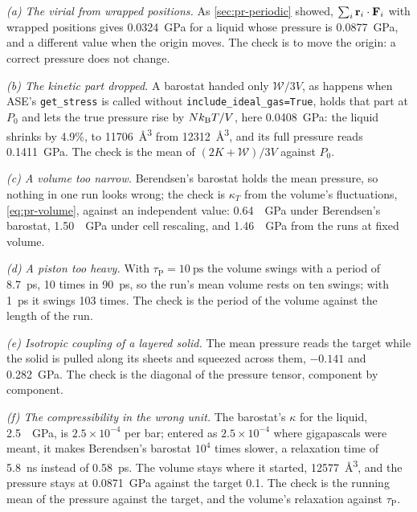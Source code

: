 \emph{(a) The virial from wrapped positions.} As \cref{sec:pr-periodic}
showed, $\sum_i\bm{\mathrm{r}}_i\cdot\bm{\mathrm{F}}_i$ with wrapped positions gives
\SI{0.0324}{\giga\pascal} for a liquid whose pressure is
\SI{0.0877}{\giga\pascal}, and a different value when the origin moves.
The check is to move the origin: a correct pressure does not change.

\emph{(b) The kinetic part dropped.} A barostat handed only $\mathcal{W}/3V$,
as happens when ASE's \texttt{get\_stress} is called without
\texttt{include\_ideal\_gas=True}, holds that part at $P_0$ and lets the
true pressure rise by $Nk_{\mathrm{B}} T/V$, here \SI{0.0408}{\giga\pascal}: the
liquid shrinks by 4.9\%, to \SI{11706}{\angstrom\cubed} from
\SI{12312}{\angstrom\cubed}, and its full pressure reads
\SI{0.1411}{\giga\pascal}. The check is the mean of $(2K +
\mathcal{W})/3V$ against $P_0$.

\emph{(c) A volume too narrow.} Berendsen's barostat holds the mean
pressure, so nothing in one run looks wrong; the check is $\kappa_T$ from
the volume's fluctuations, \cref{eq:pr-volume}, against an independent
value: \SI{0.64}{\per\giga\pascal} under Berendsen's barostat,
\SI{1.50}{\per\giga\pascal} under cell rescaling, and
\SI{1.46}{\per\giga\pascal} from the runs at fixed volume.

\emph{(d) A piston too heavy.} With $\tau_{\mathrm P} =
\SI{10}{\pico\second}$ the volume swings with a period of
\SI{8.7}{\pico\second}, 10 times in \SI{90}{\pico\second}, so the run's
mean volume rests on ten swings; with \SI{1}{\pico\second} it swings 103
times. The check is the period of the volume against the length of the
run.

\emph{(e) Isotropic coupling of a layered solid.} The mean pressure reads
the target while the solid is pulled along its sheets and squeezed across
them, $-0.141$ and \SI{+0.282}{\giga\pascal}. The check is the diagonal
of the pressure tensor, component by component.

\emph{(f) The compressibility in the wrong unit.} The barostat's $\kappa$
for the liquid, \SI{2.5}{\per\giga\pascal}, is $2.5\times10^{-4}$ per bar; entered
as $2.5\times10^{-4}$ where gigapascals were meant, it makes Berendsen's
barostat $10^4$ times slower, a relaxation time of
\SI{5.8}{\nano\second} instead of \SI{0.58}{\pico\second}. The volume
stays where it started, \SI{12577}{\angstrom\cubed}, and the pressure
stays at \SI{0.0871}{\giga\pascal} against the target 0.1. The check is
the running mean of the pressure against the target, and the volume's
relaxation against $\tau_{\mathrm P}$.

